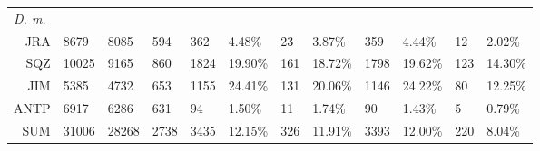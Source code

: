 \documentclass[a4paper,8pt]{article}
\begin{document}
\begin{table}[]
\begin{adjustwidth}{-1.5in}{0in}
\begin{tabular}{llllllllllll}
\midrule

\multicolumn{1}{l|}{\emph{D. m.}} & \multicolumn{11}{l}{} \\

\multicolumn{1}{r|}{JRA} & 8679 & 8085 & 594 & \multicolumn{1}{|l}{362} & 4.48\% & 23 & 3.87\% & \multicolumn{1}{|l}{359} & 4.44\% & 12 & 2.02\%\\ 
\multicolumn{1}{r|}{SQZ} & 10025 & 9165 & 860 & \multicolumn{1}{|l}{1824} & 19.90\% & 161 & 18.72\% & \multicolumn{1}{|l}{1798} & 19.62\% & 123 & 14.30\%\\ 
\multicolumn{1}{r|}{JIM} & 5385 & 4732 & 653 & \multicolumn{1}{|l}{1155} & 24.41\% & 131 & 20.06\% & \multicolumn{1}{|l}{1146} & 24.22\% & 80 & 12.25\%\\ 
\multicolumn{1}{r|}{ANTP} & 6917 & 6286 & 631 & \multicolumn{1}{|l}{94} & 1.50\% & 11 & 1.74\% & \multicolumn{1}{|l}{90} & 1.43\% & 5 & 0.79\%\\ 
\midrule
\multicolumn{1}{r|}{SUM} & 31006 & 28268 & 2738 & \multicolumn{1}{|l}{3435} & 12.15\% & 326 & 11.91\% & \multicolumn{1}{|l}{3393} & 12.00\% & 220 & 8.04\%\\ 
\bottomrule
\end{tabular}
\end{adjustwidth}
\end{table}
\end{document}
